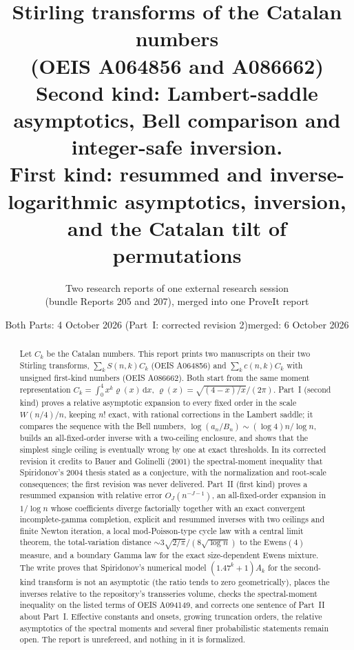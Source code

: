 \documentclass[11pt,letterpaper]{article}
\title{\textbf{Stirling transforms of the Catalan numbers\\ (OEIS A064856 and A086662)}\\[7pt]
\large Second kind: Lambert-saddle asymptotics, Bell comparison and integer-safe inversion.\\ First kind: resummed and inverse-logarithmic asymptotics, inversion,\\ and the Catalan tilt of permutations}
\author{Two research reports of one external research session\\(bundle Reports 205 and 207), merged into one ProveIt report}
\date{Both Parts: 4 October 2026 (Part~I: corrected revision 2)\quad merged: 6 October 2026}
\numberwithin{equation}{section}
\theoremstyle{remark}\newtheorem{remark}[theorem]{Remark}
\begin{document}
\hypersetup{pageanchor=false}
\maketitle
\begin{abstract}
Let $C_k$ be the Catalan numbers. This report prints two manuscripts on their two Stirling transforms, $\sum_kS(n,k)C_k$ (OEIS A064856) and $\sum_kc(n,k)C_k$ with unsigned first-kind numbers (OEIS A086662). Both start from the same moment representation $C_k=\int_0^4x^k\varrho(x)\,\mathrm dx$, $\varrho(x)=\sqrt{(4-x)/x}/(2\pi)$. Part~I (second kind) proves a relative asymptotic expansion to every fixed order in the scale $W(n/4)/n$, keeping $n!$ exact, with rational corrections in the Lambert saddle; it compares the sequence with the Bell numbers, $\log(a_n/B_n)\sim(\log4)n/\log n$, builds an all-fixed-order inverse with a two-ceiling enclosure, and shows that the simplest single ceiling is eventually wrong by one at exact thresholds. In its corrected revision it credits to Bauer and Golinelli (2001) the spectral-moment inequality that Spiridonov's 2004 thesis stated as a conjecture, with the normalization and root-scale consequences; the first revision was never delivered. Part~II (first kind) proves a resummed expansion with relative error $O_J(n^{-J-1})$, an all-fixed-order expansion in $1/\log n$ whose coefficients diverge factorially together with an exact convergent incomplete-gamma completion, explicit and resummed inverses with two ceilings and finite Newton iteration, a local mod-Poisson-type cycle law with a central limit theorem, the total-variation distance $\sim3\sqrt{2/\pi}/(8\sqrt{\log n})$ to the Ewens$(4)$ measure, and a boundary Gamma law for the exact size-dependent Ewens mixture. The write proves that Spiridonov's numerical model $(1.47^k+1)A_k$ for the second-kind transform is not an asymptotic (the ratio tends to zero geometrically), places the inverses relative to the repository's transseries volume, checks the spectral-moment inequality on the listed terms of OEIS A094149, and corrects one sentence of Part~II about Part~I. Effective constants and onsets, growing truncation orders, the relative asymptotics of the spectral moments and several finer probabilistic statements remain open. The report is unrefereed, and nothing in it is formalized.
\end{abstract}
\hypersetup{pageanchor=true}
\setcounter{tocdepth}{1}
{\small\setlength{\parskip}{0pt}\tableofcontents}
\newpage
\end{document}
